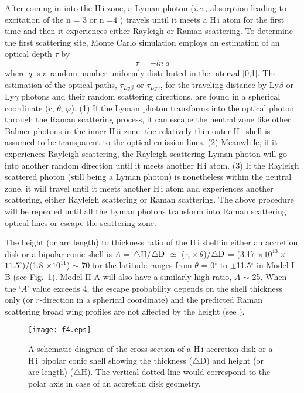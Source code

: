 \documentclass[a4paper,fleqn,usenatbib,useAMS]{mnras}
\def\ie{{\it i.e.,} }
\def\hi{H\,{\sc i}}
\def\hii{H\,{\sc ii}}
\begin{document}
{After coming in into the {\hi} zone, {a Lyman photon (\ie absorption leading to excitation of the n = 3 or n =4 )} travels until it meets a {\hi} atom for the first time and then it experiences either Rayleigh or Raman scattering. To determine the first scattering site, Monte Carlo simulation employs an estimation of an optical depth $\tau$ by
$$
\tau  =  -ln~q
$$
where $q$ is a random number uniformly distributed in the interval [0,1]. The estimation of the optical paths, $\tau_{Ly\beta}$ or $\tau_{Ly\gamma}$, for the traveling distance  by Ly$\beta$ or Ly$\gamma$ photons and their  random scattering directions, are found in a spherical coordinate ($r$, $\theta$, $\varphi$). (1) If the Lyman photon transforms into the optical photon through the Raman scattering process, it can escape the neutral zone like other Balmer photons in the inner {\hii} zone: the relatively thin outer {\hi} shell is assumed to be transparent to the optical emission lines. (2) Meanwhile, if it experiences Rayleigh scattering, the Rayleigh scattering Lyman photon will go into another random direction until it meets another {\hi} atom. (3) If the Rayleigh scattered photon (still being a Lyman photon) is nonetheless within the neutral zone, it will travel until it meets another {\hi} atom and experiences another scattering, either Rayleigh scattering or Raman scattering. The above procedure will be repeated until all the Lyman photons transform into Raman scattering optical lines or escape the scattering zone.

The height (or arc length) to thickness ratio of the {\hi} shell in either an accretion disk
or a bipolar conic shell is
$A$ = $\triangle$H/$\triangle {\rm D}$ $\simeq$  (r$_i \times \theta$)/$\triangle {\rm D}$ =
(3.17 $\times 10^{13} \times$ $11.5^{\circ}$)/(1.8 $\times 10^{11}$) $\sim$ 70 for the latitude ranges from $\theta$ = 0$^{\circ}$ to $\pm$11.5$^{\circ}$ in Model I-B (see Fig.~\ref{fig4}).
Model II-A will also have a similarly high ratio, $A$ $\sim$ 25.
When the `$A$' value exceeds 4, the escape probability {depends on the shell thickness only} (or $r$-direction in a spherical coordinate) and the predicted Raman scattering broad wing profiles are not  affected by the height (see \citealt{cha15}).



\begin{figure}
  \centering
\texttt{[image: f4.eps]}
\caption{A schematic diagram of the cross-section of a {\hi} accretion disk or a  {\hi} bipolar conic shell showing the thickness ($\triangle$D) and  height  (or arc length) ($\triangle$H). The vertical dotted line would correspond to the polar axis in case of an accretion disk geometry. }
\label{fig4}
\end{figure}

}
\end{document}
